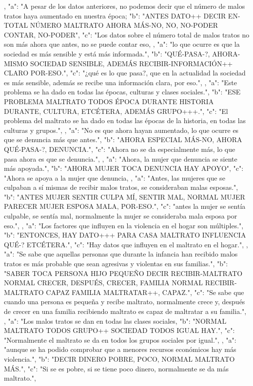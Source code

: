 ,
{
"a": "A pesar de los datos anteriores, no podemos decir que el número de malos tratos haya aumentado en nuestra época;
"b": "ANTES DATO++ DECIR EN-TOTAL NÚMERO MALTRATO AHORA MÁS-NO, NO, NO-PODER CONTAR, NO-PODER",
"c": "Los datos sobre el número total de malos tratos no son más ahora que antes, no se puede contar eso,
}
,
{
"a": "lo que ocurre es que la sociedad es más sensible y está más informada.",
"b": "QUÉ-PASA-?, AHORA-MISMO SOCIEDAD SENSIBLE, ADEMÁS RECIBIR-INFORMACIÓN++ CLARO POR-ESO.",
"c": "¿qué es lo que pasa?, que en la actualidad la sociedad es más sensible, además se recibe una información clara, por eso.",
}
,
{
"a": "Este problema se ha dado en todas las épocas, culturas y clases sociales.",
"b": "ESE PROBLEMA MALTRATO TODOS ÉPOCA DURANTE HISTORIA DURANTE, CULTURA, ETCÉTERA, ADEMÁS GRUPO+++.",
"c": "El problema del maltrato se ha dado en todas las épocas de la historia, en todas las culturas y grupos.",
}
,
{
"a": "No es que ahora hayan aumentado, lo que ocurre es que se denuncia más que antes.",
"b": "AHORA ESPECIAL MÁS-NO, AHORA QUÉ-PASA-?, DENUNCIA.",
"c": "Ahora no se da especialmente más, lo que pasa ahora es que se denuncia.",
}
,
{
"a": "Ahora, la mujer que denuncia se siente más apoyada.",
"b": "AHORA MUJER TOCA DENUNCIA HAY APOYO",
"c": "Ahora se apoya a la mujer que denuncia,
}
,
{
"a": "Antes, las mujeres que se culpaban a sí mismas de recibir malos tratos, se consideraban malas esposas.",
"b": "ANTES MUJER SENTIR CULPA MÍ, SENTIR MAL, NORMAL MUJER PARECER MUJER ESPOSA MALA, POR-ESO.",
"c": "antes la mujer se sentía culpable, se sentía mal, normalmente la mujer se consideraba mala esposa por eso.",
}
,
{
"a": "Los factores que influyen en la violencia en el hogar son múltiples.",
"b": "ENTONCES, HAY DATO+++ PARA CASA MALTRATO INFLUENCIA QUÉ-? ETCÉTERA.",
"c": "Hay datos que influyen en el maltrato en el hogar.",
}
,
{
"a": "Se sabe que aquellas personas que durante la infancia han recibido malos tratos es más probable que sean agresivas y violentas en sus familias.",
"b": "SABER TOCA PERSONA HIJO PEQUEÑO DECIR RECIBIR-MALTRATO NORMAL CRECER, DESPUÉS, CRECER, FAMILIA NORMAL RECIBIR-MALTRATO CAPAZ FAMILIA MALTRATAR++, CAPAZ.",
"c": "Se sabe que cuando una persona es pequeña y recibe maltrato, normalmente crece y, después de crecer en una familia recibiendo maltrato es capaz de maltratar a su familia.",
}
,
{
"a": "Los malos tratos se dan en todas las clases sociales,
"b": "NORMAL MALTRATO TODOS GRUPO++ SOCIEDAD TODOS IGUAL HAY.",
"c": "Normalmente el maltrato se da en todos los grupos sociales por igual.",
}
,
{
"a": "aunque se ha podido comprobar que a menores recursos económicos hay más violencia.",
"b": "DECIR DINERO POBRE, POCO, NORMAL MALTRATO MÁS.",
"c": "Si se es pobre, si se tiene poco dinero, normalmente se da más maltrato.",
}

